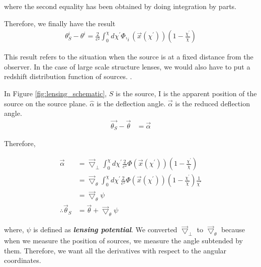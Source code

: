 \documentclass[12pt]{article}
\newcommand{\beq}{\begin{equation}}
\newcommand{\eeq}{\end{equation}}
\newcommand{\beqa}{\begin{eqnarray}}
\newcommand{\eeqa}{\end{eqnarray}}
\newcommand{\beqal}{\begin{aligned}}
\newcommand{\eeqal}{\end{aligned}}
\numberwithin{equation}{section}
\begin{document}
where the second equality has been obtained by doing integration by parts. 

Therefore, we finally have the result
\begin{equation}
\begin{aligned}
\theta_S^i - \theta^i = \frac{2}{c^2} \int_{0}^{\chi} d\chi^{\prime} \Phi,_i(\vec{x}(\chi^{\prime})) \left(1 - \frac{\chi^{\prime}}{\chi}\right)
\end{aligned}
\end{equation}

This result refers to the situation when the source is at a fixed distance from the observer. In the case of large scale structure lenses, we would also have to put a redshift distribution function of sources. {\color{red}{refine}}.


In Figure \ref{fig:lensing_schematic}, $S$ is the source, I is the apparent position of the source on the source plane. $\hat{\alpha}$ is the deflection angle. $\vec{\alpha}$ is the reduced deflection angle. 
\beqa
\vec{\theta_S} -\vec{\theta} &= \vec{\alpha} 
\eeqa

Therefore,

\beq
\beqal
\vec{\alpha} &= \vec{\bigtriangledown}_\perp \int_{0}^{\chi} d\chi^{\prime} \frac{2}{c^2}\Phi(\vec{x}(\chi^{\prime})) \left(1 - \frac{\chi^{\prime}}{\chi}\right)
\\
&=  \vec{\bigtriangledown}_\theta  \int_{0}^{\chi} d\chi^{\prime} \frac{2}{c^2}\Phi(\vec{x}(\chi^{\prime})) \left(1 - \frac{\chi^{\prime}}{\chi}\right) \frac{1}{\chi^\prime}
\\
&= \vec{\bigtriangledown}_\theta \psi
\\
\therefore \vec{\theta}_S  &=\vec{\theta}+  \vec{\bigtriangledown}_\theta \psi
\eeqal
\eeq

where, $\psi$ is defined as \textbf{\textit{lensing potential}}. We converted $\vec{\bigtriangledown}_\perp$ to $\vec{\bigtriangledown}_\theta$ because when we measure the position of sources, we measure the  angle subtended by them. Therefore, we want all the derivatives with respect to the angular coordinates.
%
%
%
%
\end{document}
